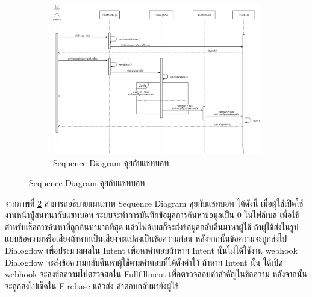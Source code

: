 \begin{figure}
\begin{figure}[H]
	\centering
	\includegraphics[width=0.8\columnwidth]
	{Figures/3/Sequence/chatbot}
	\caption{Sequence Diagram คุยกับแชทบอท}
	\label{Fig:Sequence-chatbot}
\end{figure}
\end{figure}
\newpage
จากภาพที่ \ref{Fig:Sequence-chatbot} สามารถอธิบายแผนภาพ Sequence Diagram คุยกับแชทบอท ได้ดังนี้ 
เมื่อผู้ใช้เปิดใช้งานหน้าปู่สนทนากับแชทบอท ระบบจะทำการบันทึกข้อมูลการค้นหาข้อมูลเป็น 0 ในไฟล์เบส เพื่อใช้สำหรับเช็คการค้นหาที่ถูกค้นหามากที่สุด
แล้วไฟล์เบสก็จะส่งข้อมูลกลับคืนมาหาผู้ใช้ ถ้าผู้ใช้ส่งในรูปแบบข้อความหรือเสียงถ้าหากเป็นเสียงจะแปลงเป็นข้อความก่อน หลังจากนั้นข้อความจะถูกส่งไป Dialogflow 
เพื่อประมวลผลใน Intent เพื่อหาคำตอบถ้าหาก Intent นั้นไม่ได้ใช้งาน webhook Dialogflow จะส่งข้อความกลับคืนหาผู้ใช้ตามคำตอบที่ได้ตั้งค่าไว้ ถ้าหาก Intent นั้น
ได้เปิด webhook จะส่งข้อความไปตรวจสอใน Fullfillment เพื่อตรวจสอบคำสำคัญในข้อความ หลังจากนั้นจะถูกส่งไปเช็คใน Firebase แล้วส่ง
คำตอบกลับมายังผู้ใช้


